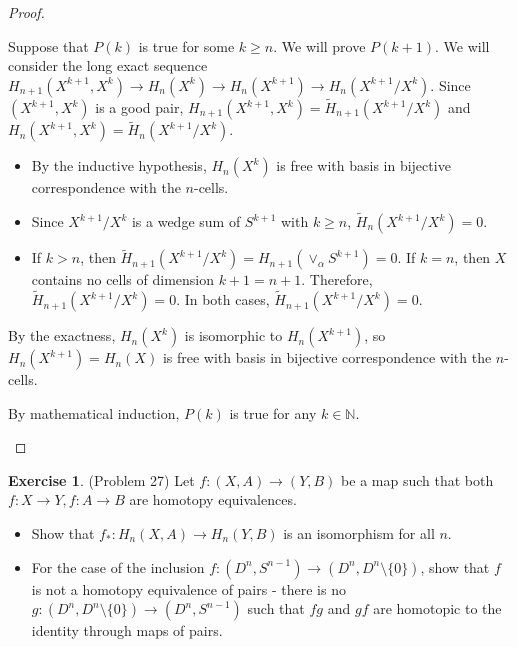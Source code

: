 \documentclass[12pt, psamsfonts]{amsart}
\theoremstyle{definition}
\newtheorem*{exer}{Exercise}
\theoremstyle{remark}
\numberwithin{equation}{section}
\begin{document}
\begin{proof}
\begin{itemize}
      Suppose that $P(k)$ is true for some $k \geq n$.
      We will prove $P(k + 1)$.
      We will consider the long exact sequence $H_{n + 1}(X^{k + 1}, X^k) \rightarrow H_n(X^k) \rightarrow H_n(X^{k + 1}) \rightarrow H_n(X^{k + 1} / X^k)$.
      Since $(X^{k + 1}, X^k)$ is a good pair, $H_{n + 1}(X^{k + 1}, X^k) = \tilde{H}_{n + 1}(X^{k + 1} / X^k)$ and $H_{n}(X^{k + 1}, X^k) = \tilde{H}_{n}(X^{k + 1} / X^k)$.
      \begin{itemize}
        \item
          By the inductive hypothesis, $H_n(X^k)$ is free with basis in bijective correspondence with the $n$-cells.
        \item
          Since $X^{k + 1} / X^k$ is a wedge sum of $S^{k + 1}$ with $k \geq n$, $\tilde{H}_n(X^{k + 1} / X^k) = 0$.
        \item
          If $k > n$, then $\tilde{H}_{n + 1}(X^{k + 1} / X^k) = H_{n + 1}(\vee_{\alpha} S^{k + 1}) = 0$.
          If $k = n$, then $X$ contains no cells of dimension $k + 1 = n + 1$.
          Therefore, $\tilde{H}_{n + 1}(X^{k + 1} / X^k) = 0$.
          In both cases, $\tilde{H}_{n + 1}(X^{k + 1} / X^k) = 0$.
      \end{itemize}
      By the exactness, $H_n(X^k)$ is isomorphic to $H_n(X^{k + 1})$, so $H_n(X^{k + 1}) = H_n(X)$ is free with basis in bijective correspondence with the $n$-cells.

      By mathematical induction, $P(k)$ is true for any $k \in \mathbb{N}$.
  \end{itemize}
\end{proof}

\begin{exer}{(Problem 27)}
  Let $f:(X, A) \rightarrow (Y, B)$ be a map such that both $f: X \rightarrow Y, f:A \rightarrow B$ are homotopy equivalences.

  \begin{itemize}
    \item
      Show that $f_* : H_n(X, A) \rightarrow  H_n(Y, B)$ is an isomorphism for all $n$.
    \item
      For the case of the inclusion $f:(D^n, S^{n - 1}) \rightarrow (D^n, D^n \setminus \{ 0 \})$, show that $f$ is not a homotopy equivalence of pairs -
      there is no $g: (D^n, D^n \setminus \{ 0 \}) \rightarrow (D^n, S^{n - 1})$ such that $fg$ and $gf$ are homotopic to the identity through maps of pairs.
  \end{itemize}
\end{exer}
\end{document}
